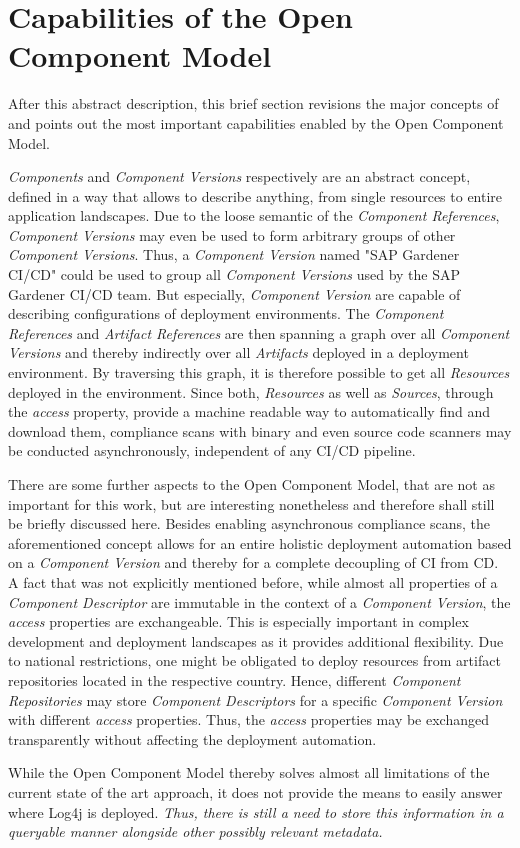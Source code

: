 \section{Capabilities of the Open Component Model}
After this abstract description, this brief section revisions the major concepts of and points out the most important capabilities enabled by the Open Component Model.\par 
\emph{Components} and \emph{Component Versions} respectively are an abstract concept, defined in a way that allows to describe anything, from single resources to entire application landscapes. Due to the loose semantic of the \emph{Component References}, \emph{Component Versions} may even be used to form arbitrary groups of other \emph{Component Versions}. Thus, a \emph{Component Version} named "SAP Gardener CI/CD" could be used to group all \emph{Component Versions} used by the SAP Gardener CI/CD team. But especially, \emph{Component Version} are capable of describing configurations of deployment environments. The \emph{Component References} and \emph{Artifact References} are then spanning a graph over all \emph{Component Versions} and thereby indirectly over all \emph{Artifacts} deployed in a deployment environment. By traversing this graph, it is therefore possible to get all \emph{Resources} deployed in the environment. Since both, \emph{Resources} as well as \emph{Sources}, through the \emph{access} property, provide a machine readable way to automatically find and download them, compliance scans with binary and even source code scanners may be conducted asynchronously, independent of any CI/CD pipeline.\par
There are some further aspects to the Open Component Model, that are not as important for this work, but are interesting nonetheless and therefore shall still be briefly discussed here. Besides enabling asynchronous compliance scans, the aforementioned concept allows for an entire holistic deployment automation based on a \emph{Component Version} and thereby for a complete decoupling of CI from CD. A fact that was not explicitly mentioned before, while almost all properties of a \emph{Component Descriptor} are immutable in the context of a \emph{Component Version}, the \emph{access} properties are exchangeable. This is especially important in complex development and deployment landscapes as it provides additional flexibility. Due to national restrictions, one might be obligated to deploy resources from artifact repositories located in the respective country. Hence, different \emph{Component Repositories} may store \emph{Component Descriptors} for a specific \emph{Component Version} with different \emph{access} properties. Thus, the \emph{access} properties may be exchanged transparently without affecting the deployment automation.\par
While the Open Component Model thereby solves almost all limitations of the current state of the art approach, it does not provide the means to easily answer where Log4j is deployed. \emph{Thus, there is still a need to store this information in a queryable manner alongside other possibly relevant metadata.}

